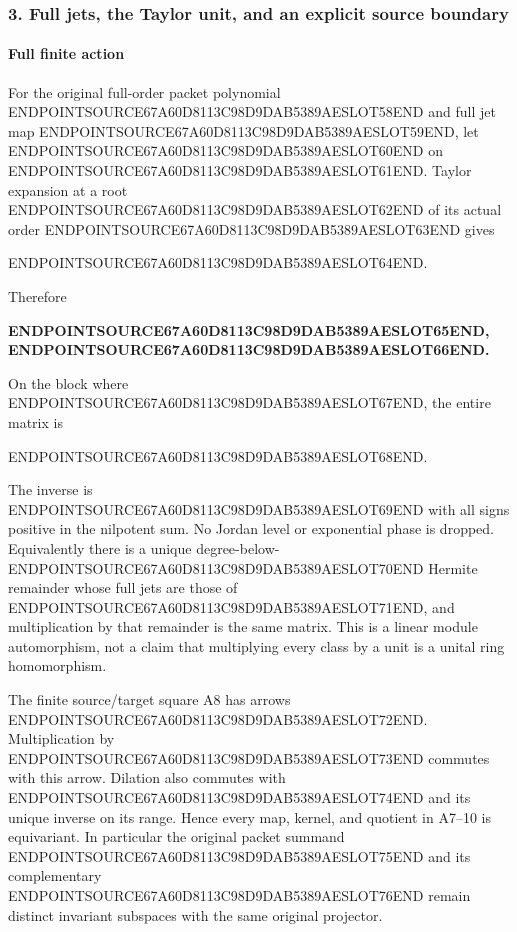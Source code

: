 \subsubsection{3. Full jets, the Taylor unit, and an explicit source boundary}\label{endpoint-f1_scaling--full-jets-the-taylor-unit-and-an-explicit-source-boundary}

\paragraph{Full finite action}\label{endpoint-f1_scaling--full-finite-action}

For the original full-order packet polynomial ENDPOINTSOURCE67A60D8113C98D9DAB5389AESLOT58END and full jet map ENDPOINTSOURCE67A60D8113C98D9DAB5389AESLOT59END, let ENDPOINTSOURCE67A60D8113C98D9DAB5389AESLOT60END on ENDPOINTSOURCE67A60D8113C98D9DAB5389AESLOT61END. Taylor expansion at a root ENDPOINTSOURCE67A60D8113C98D9DAB5389AESLOT62END of its actual order ENDPOINTSOURCE67A60D8113C98D9DAB5389AESLOT63END gives

ENDPOINTSOURCE67A60D8113C98D9DAB5389AESLOT64END.

Therefore

\textbf{ENDPOINTSOURCE67A60D8113C98D9DAB5389AESLOT65END, ENDPOINTSOURCE67A60D8113C98D9DAB5389AESLOT66END.}

On the block where ENDPOINTSOURCE67A60D8113C98D9DAB5389AESLOT67END, the entire matrix is

ENDPOINTSOURCE67A60D8113C98D9DAB5389AESLOT68END.

The inverse is ENDPOINTSOURCE67A60D8113C98D9DAB5389AESLOT69END with all signs positive in the nilpotent sum. No Jordan level or exponential phase is dropped. Equivalently there is a unique degree-below-ENDPOINTSOURCE67A60D8113C98D9DAB5389AESLOT70END Hermite remainder whose full jets are those of ENDPOINTSOURCE67A60D8113C98D9DAB5389AESLOT71END, and multiplication by that remainder is the same matrix. This is a linear module automorphism, not a claim that multiplying every class by a unit is a unital ring homomorphism.

The finite source/target square A8 has arrows ENDPOINTSOURCE67A60D8113C98D9DAB5389AESLOT72END. Multiplication by ENDPOINTSOURCE67A60D8113C98D9DAB5389AESLOT73END commutes with this arrow. Dilation also commutes with ENDPOINTSOURCE67A60D8113C98D9DAB5389AESLOT74END and its unique inverse on its range. Hence every map, kernel, and quotient in A7--10 is equivariant. In particular the original packet summand ENDPOINTSOURCE67A60D8113C98D9DAB5389AESLOT75END and its complementary ENDPOINTSOURCE67A60D8113C98D9DAB5389AESLOT76END remain distinct invariant subspaces with the same original projector.

